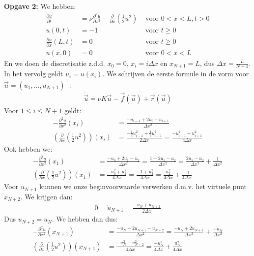 \documentclass{article}
\begin{document}
\textbf{Opgave 2:}
We hebben:
\begin{align*}
\frac{\partial u}{\partial t} &= \nu \frac{\partial^2 u}{\partial x^2} -\frac{\partial}{\partial x}\left(\frac{1}{2}u^2\right) &\text{ voor } 0<x<L, t>0\\
u(0,t) &= -1 &\text{ voor } t\geq 0\\
\frac{\partial u}{\partial x}(L,t) &= 0 &\text{ voor } t\geq 0\\
u(x,0) &= 0 &\text{ voor } 0<x<L
\end{align*}
En we doen de discretisatie z.d.d. $x_0 = 0$, $x_i= i \Delta x$ en $x_{N+1}=L$, dus $\Delta x = \frac{L}{N+1}$.
In het vervolg geldt $u_i=u(x_i)$.
We schrijven de eerste formule in de vorm voor $\vec{u} = (u_1,\dots,u_{N+1})^\intercal$:
\begin{align*}
\dot{\vec{u}} = \nu K \vec{u} - \vec{f}(\vec{u})+\vec{r}(\vec{u})
\end{align*}
Voor $1\leq i\leq N+1$ geldt:
\begin{align*}
-\frac{\partial^2 u}{\partial x^2}(x_i) &= \frac{-u_{i-1}+2u_i-u_{i+1}}{\Delta x^2}\\
\left(\frac{\partial}{\partial x}\left(\frac{1}{2}u^2\right)\right)(x_i) &= \frac{-\frac{1}{2}u_{i-1}^2+\frac{1}{2}u_{i+1}^2}{2\Delta x}
= \frac{-u_{i-1}^2+u_{i+1}^2}{4\Delta x}
\end{align*}
Ook hebben we:
\begin{align*}
-\frac{\partial^2 u}{\partial x^2}(x_1) &= \frac{-u_{0}+2u_1-u_{2}}{\Delta x^2}
= \frac{1+2u_1-u_{2}}{\Delta x^2}
= \frac{2u_1-u_{2}}{\Delta x^2} +\frac{1}{\Delta x^2}\\
\left(\frac{\partial}{\partial x}\left(\frac{1}{2}u^2\right)\right)(x_1) &= \frac{-u_{0}^2+u_{2}^2}{4\Delta x}
= \frac{-1+u_{2}^2}{4\Delta x}
= \frac{u_{2}^2}{4\Delta x}+\frac{-1}{4\Delta x}
\end{align*}
Voor $u_{N+1}$ kunnen we onze beginvoorwaarde verwerken d.m.v. het virtuele punt $x_{N+2}$.
We krijgen dan:
\begin{align*}
0=\dot{u}_{N+1} = \frac{-u_{N}+u_{N+2}}{2\Delta x}
\end{align*}
Dus $u_{N+2}=u_N$.
We hebben dan dus:
\begin{align*}
-\frac{\partial^2 u}{\partial x^2}(x_{N+1}) &= \frac{-u_{N}+2u_{N+1}-u_{N+2}}{\Delta x^2}
= \frac{-u_{N}+2u_{N+1}}{\Delta x^2} +\frac{-u_{N}}{\Delta x^2}\\
\left(\frac{\partial}{\partial x}\left(\frac{1}{2}u^2\right)\right)(x_{N+1}) &= \frac{-u_{N}^2+u_{N+2}^2}{4\Delta x}
= \frac{-u_{N}^2}{4\Delta x} +\frac{u_{N}^2}{4\Delta x}
\end{align*}
\end{document}
